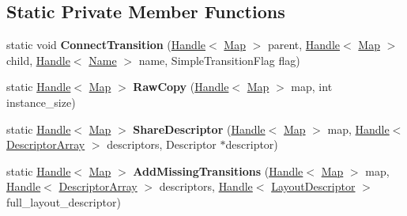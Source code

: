 \subsection*{Static Private Member Functions}
\begin{DoxyCompactItemize}
\item 
static void {\bfseries Connect\+Transition} (\hyperlink{classv8_1_1internal_1_1_handle}{Handle}$<$ \hyperlink{classv8_1_1internal_1_1_map}{Map} $>$ parent, \hyperlink{classv8_1_1internal_1_1_handle}{Handle}$<$ \hyperlink{classv8_1_1internal_1_1_map}{Map} $>$ child, \hyperlink{classv8_1_1internal_1_1_handle}{Handle}$<$ \hyperlink{classv8_1_1internal_1_1_name}{Name} $>$ name, Simple\+Transition\+Flag flag)\hypertarget{classv8_1_1internal_1_1_map_a9a3c1ae5d094a1ceb291c395dd0faec3}{}\label{classv8_1_1internal_1_1_map_a9a3c1ae5d094a1ceb291c395dd0faec3}

\item 
static \hyperlink{classv8_1_1internal_1_1_handle}{Handle}$<$ \hyperlink{classv8_1_1internal_1_1_map}{Map} $>$ {\bfseries Raw\+Copy} (\hyperlink{classv8_1_1internal_1_1_handle}{Handle}$<$ \hyperlink{classv8_1_1internal_1_1_map}{Map} $>$ map, int instance\+\_\+size)\hypertarget{classv8_1_1internal_1_1_map_a9e298be7885c0f00ce676ea821b9e487}{}\label{classv8_1_1internal_1_1_map_a9e298be7885c0f00ce676ea821b9e487}

\item 
static \hyperlink{classv8_1_1internal_1_1_handle}{Handle}$<$ \hyperlink{classv8_1_1internal_1_1_map}{Map} $>$ {\bfseries Share\+Descriptor} (\hyperlink{classv8_1_1internal_1_1_handle}{Handle}$<$ \hyperlink{classv8_1_1internal_1_1_map}{Map} $>$ map, \hyperlink{classv8_1_1internal_1_1_handle}{Handle}$<$ \hyperlink{classv8_1_1internal_1_1_descriptor_array}{Descriptor\+Array} $>$ descriptors, Descriptor $\ast$descriptor)\hypertarget{classv8_1_1internal_1_1_map_aff64d8965ad12393445588d93cec49af}{}\label{classv8_1_1internal_1_1_map_aff64d8965ad12393445588d93cec49af}

\item 
static \hyperlink{classv8_1_1internal_1_1_handle}{Handle}$<$ \hyperlink{classv8_1_1internal_1_1_map}{Map} $>$ {\bfseries Add\+Missing\+Transitions} (\hyperlink{classv8_1_1internal_1_1_handle}{Handle}$<$ \hyperlink{classv8_1_1internal_1_1_map}{Map} $>$ map, \hyperlink{classv8_1_1internal_1_1_handle}{Handle}$<$ \hyperlink{classv8_1_1internal_1_1_descriptor_array}{Descriptor\+Array} $>$ descriptors, \hyperlink{classv8_1_1internal_1_1_handle}{Handle}$<$ \hyperlink{classv8_1_1internal_1_1_layout_descriptor}{Layout\+Descriptor} $>$ full\+\_\+layout\+\_\+descriptor)\hypertarget{classv8_1_1internal_1_1_map_a2110410a0d67ac08355523f318e05419}{}\label{classv8_1_1internal_1_1_map_a2110410a0d67ac08355523f318e05419}


\end{DoxyCompactItemize}
